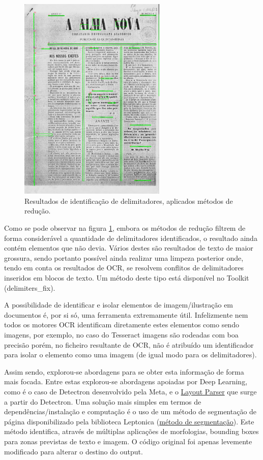 \begin{figure}[H]
	\centering
	\includegraphics[width=7cm]{images/ilustracoes/get_delimiters_final_example.png}
	\caption{Resultados de identificação de delimitadores, aplicados métodos de redução.}
	\label{fig:get_delimiters_final_example}
\end{figure}

Como se pode observar na figura \ref{fig:get_delimiters_final_example}, embora os métodos de redução filtrem de forma considerável a quantidade de delimitadores identificados, o resultado ainda contém elementos que não devia. Vários destes são resultados de texto de maior grossura, sendo portanto possível ainda realizar uma limpeza posterior onde, tendo em conta os resultados de OCR, se resolvem conflitos de delimitadores inseridos em blocos de texto. Um método deste tipo está disponível no Toolkit (delimiters\_fix).


\label{contribution_image_document_image_identification}


A possibilidade de identificar e isolar elementos de imagem/ilustração em documentos é, por si só, uma ferramenta extremamente útil. Infelizmente nem todos os motores OCR identificam diretamente estes elementos como sendo imagens, por exemplo, no caso do Tesseract imagens são rodeadas com boa precisão porém, no ficheiro resultante de OCR, não é atribuído um identificador para isolar o elemento como uma imagem (de igual modo para os delimitadores). 

Assim sendo, explorou-se abordagens para se obter esta informação de forma mais focada.
Entre estas explorou-se abordagens apoiadas por Deep Learning, como é o caso de Detectron desenvolvido pela Meta, e o \href{https://layout-parser.readthedocs.io/en/latest/index.html}{Layout Parser} que surge a partir do Detectron. 
Uma solução mais simples em termos de dependências/instalação e computação é o uso de um método de segmentação de página disponibilizado pela biblioteca Leptonica (\href{https://tpgit.github.io/Leptonica/livre__pageseg_8c_source.html}{método de segmentação}). 
Este método identifica, através de múltiplas aplicações de morfologias, bounding boxes para zonas previstas de texto e imagem.
O código original foi apenas levemente modificado para alterar o destino do output.


